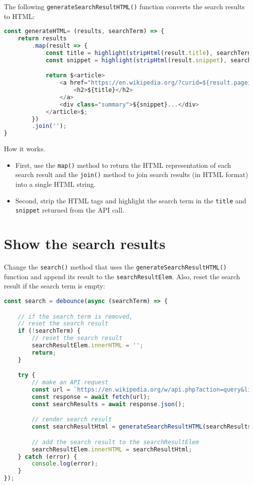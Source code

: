 \documentclass[11pt]{article}
\begin{document}
The following \verb|generateSearchResultHTML()| function converts the search
results to HTML:

\begin{lstlisting}[language=JavaScript]
const generateHTML= (results, searchTerm) => {
    return results
        .map(result => {
            const title = highlight(stripHtml(result.title), searchTerm);
            const snippet = highlight(stripHtml(result.snippet), searchTerm);

            return $<article>
                <a href="https://en.wikipedia.org/?curid=${result.pageid}">
                    <h2>${title}</h2>
                </a>
                <div class="summary">${snippet}...</div>
            </article>$;
        })
        .join('');
}
\end{lstlisting}
\newpage
\noindent
How it works.
\begin{itemize}
\item First, use the \verb|map()| method to return the HTML representation of each
search result and the \verb|join()| method to join search results
(in HTML format) into a single HTML string.
\item Second, strip the HTML tags and highlight the search term in
the \verb|title| and \verb|snippet| returned from the API call.
\end{itemize}
\section*{Show the search results}

Change the \verb|search()| method that uses the \verb|generateSearchResultHTML()|
function and append its result to the \verb|searchResultElem|.
Also, reset the search result if the search term is empty:

\begin{lstlisting}[language=JavaScript]
const search = debounce(async (searchTerm) => {

    // if the search term is removed, 
    // reset the search result
    if (!searchTerm) {
        // reset the search result
        searchResultElem.innerHTML = '';
        return;
    }

    try {
        // make an API request
        const url = `https://en.wikipedia.org/w/api.php?action=query&list=search&prop=info|extracts&inprop=url&utf8=&format=json&origin=*&srlimit=10&srsearch=${searchTerm}`;
        const response = await fetch(url);
        const searchResults = await response.json();

        // render search result
        const searchResultHtml = generateSearchResultHTML(searchResults.query.search, searchTerm);

        // add the search result to the searchResultElem
        searchResultElem.innerHTML = searchResultHtml;
    } catch (error) {
        console.log(error);
    }
});
\end{lstlisting}
\end{document}
